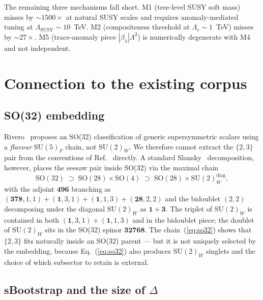 \documentclass[%
 aps,
 prd,
 reprint,
 nofootinbib,
 superscriptaddress,
 amsmath,
 amssymb,
]{revtex4-2}
\begin{document}
The remaining three mechanisms fall short. M1 (tree-level SUSY soft mass) misses by $\sim 1500\times$ at natural SUSY scales and requires anomaly-mediated tuning at $\Lambda_{\mathrm{SUSY}}\sim 10$~TeV. M2 (compositeness threshold at $\Lambda_c\sim 1$~TeV) misses by $\sim 27\times$. M5 (trace-anomaly piece $|\beta_\lambda|\Lambda^2$) is numerically degenerate with M4 and not independent.

\section{Connection to the existing corpus}\label{sec:corpus}

\subsection{SO(32) embedding}

Rivero~\cite{Rivero2024SO32} proposes an SO(32) classification of generic supersymmetric scalars using a \emph{flavour} $\mathrm{SU}(5)_F$ chain, not $\mathrm{SU}(2)_W$. We therefore cannot extract the $\{2,3\}$ pair from the conventions of Ref.~\cite{Rivero2024SO32} directly. A standard Slansky~\cite{Slansky1981} decomposition, however, places the seesaw pair inside SO(32) via the maximal chain
\begin{equation}\label{eq:so32}
\mathrm{SO}(32)\;\supset\;\mathrm{SO}(28)\times\mathrm{SO}(4)\;\supset\;\mathrm{SO}(28)\times\mathrm{SU}(2)_W^{\mathrm{diag}},
\end{equation}
with the adjoint $\mathbf{496}$ branching as $(\mathbf{378},1,1)+(\mathbf{1},3,1)+(\mathbf{1},1,3)+(\mathbf{28},2,2)$ and the bidoublet $(2,2)$ decomposing under the diagonal $\mathrm{SU}(2)_W$ as $\mathbf{1}+\mathbf{3}$. The triplet of $\mathrm{SU}(2)_W$ is contained in both $(\mathbf{1},3,1)+(\mathbf{1},1,3)$ and in the bidoublet piece; the doublet of $\mathrm{SU}(2)_W$ sits in the SO(32) spinor $\mathbf{32768}$. The chain~(\ref{eq:so32}) shows that $\{2,3\}$ fits naturally inside an SO(32) parent --- but it is not uniquely selected by the embedding, because Eq.~(\ref{eq:so32}) also produces $\mathrm{SU}(2)_W$ singlets and the choice of which subsector to retain is external.

\subsection{sBootstrap and the size of $\Delta$}
\end{document}
